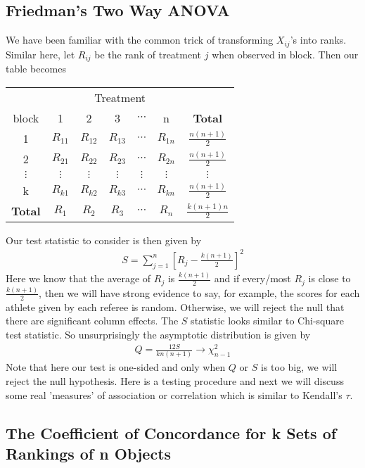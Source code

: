 \documentclass[twoside]{article}
\begin{document}
	\subsection{Friedman's Two Way ANOVA}
	We have been familiar with the common trick of transforming $X_{ij}$'s into ranks. Similar here, let $R_{ij}$ be the rank of treatment $j$ when observed in block. Then our table becomes
	\begin{center}
		\begin{tabular}{c|c|c|c|c|c|c}
			\multicolumn{7}{c}{Treatment}\\
			block & 1 & 2 & 3 & $\cdots$ & n & \textbf{Total}\\
			\hline
			1 & $R_{11}$ & $R_{12}$ & $R_{13}$ & $\cdots$ & $R_{1n}$ & $\frac{n(n+1)}{2}$\\
			\hline
			2 & $R_{21}$ & $R_{22}$ & $R_{23}$ & $\cdots$ & $R_{2n}$ & $\frac{n(n+1)}{2}$\\
			\hline
			$\vdots$ & $\vdots$ & $\vdots$ & $\vdots$ & $\vdots$ & $\vdots$ & $\vdots$\\
			\hline
			k & $R_{k1}$ & $R_{k2}$ & $R_{k3}$ & $\cdots$ & $R_{kn}$ & $\frac{n(n+1)}{2}$\\
			\hline
			\textbf{Total} & $R_1$ & $R_2$ & $R_3$ & $\cdots$ & $R_n$ & $\frac{k(n+1)n}{2}$
		\end{tabular}
	\end{center}
	Our test statistic to consider is then given by
	\begin{align*}
		S = \sum_{j=1}^{n} \left[ R_j - \frac{k(n+1)}{2} \right]^2
	\end{align*}
	Here we know that the average of $R_j$ is $\frac{k(n+1)}{2}$ and if every/most $R_j$ is close to $\frac{k(n+1)}{2}$, then we will have strong evidence to say, for example, the scores for each athlete given by each referee is random. Otherwise, we will reject the null that there are significant column effects. The $S$ statistic looks similar to Chi-square test statistic. So unsurprisingly the asymptotic distribution is given by
	\begin{align*}
		Q = \frac{12 S}{kn(n+1)} \to \chi_{n-1}^2
	\end{align*}
	Note that here our test is one-sided and only when $Q$ or $S$ is too big, we will reject the null hypothesis. Here is a testing procedure and next we will discuss some real 'measures' of association or correlation which is similar to Kendall's $\tau$.
	
	\subsection{The Coefficient of Concordance for k Sets of Rankings of n Objects} 
\end{document}
